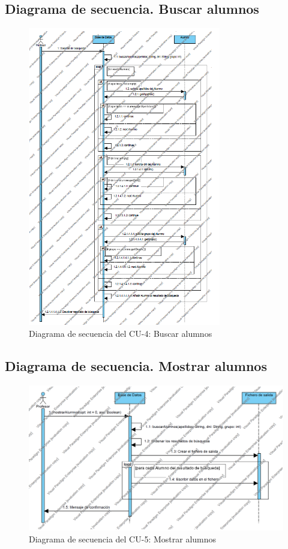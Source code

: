 \subsection{Diagrama de secuencia. Buscar alumnos}
\begin{figure}[h!]
	\centering
	\includegraphics[width=0.75\textwidth]{../design/sd-4}
	\caption{Diagrama de secuencia del CU-4: Buscar alumnos}
	\label{fig:sd004}
\end{figure}

\newpage
\subsection{Diagrama de secuencia. Mostrar alumnos}
\begin{figure}[h!]
	\centering
	\includegraphics[width=1\textwidth]{../design/sd-5}
	\caption{Diagrama de secuencia del CU-5: Mostrar alumnos}
	\label{fig:sd005}
\end{figure}


